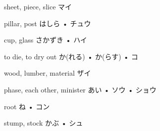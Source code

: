 



\setcounter{cardnum}{49}

		{sheet, piece, slice}
		{マイ}
		{}{}
		{}{}
		{}{}
		{}{}
		{}{}

		{pillar, post}
		{はしら • チュウ}
		{}{}
		{}{}
		{}{}
		{}{}
		{}{}

		{cup, glass}
		{さかずき • ハイ}
		{}{}
		{}{}
		{}{}
		{}{}
		{}{}

		{to die, to dry out}
		{か(れる) • か(らす) • コ}
		{}{}
		{}{}
		{}{}
		{}{}
		{}{}

		{wood, lumber, material}
		{ザイ}
		{}{}
		{}{}
		{}{}
		{}{}
		{}{}

		{phase, each other, minister}
		{あい • ソウ • ショウ}
		{}{}
		{}{}
		{}{}
		{}{}
		{}{}

		{root}
		{ね • コン}
		{}{}
		{}{}
		{}{}
		{}{}
		{}{}

		{stump, stock}
		{かぶ • シュ}
		{}{}
		{}{}
		{}{}
		{}{}
		{}{}

